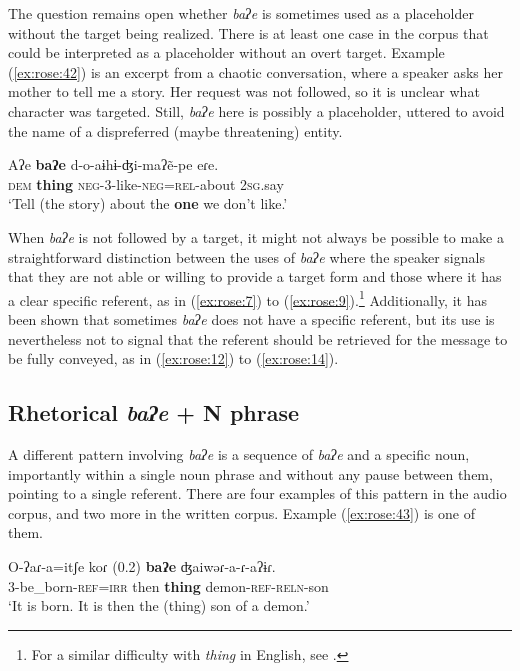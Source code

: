 \documentclass[output=paper]{langscibook}
\begin{document}
The question remains open whether \textit{baʔe} is sometimes used as a placeholder without the target being realized. There is at least one case in the corpus that could be interpreted as a placeholder without an overt target. Example (\ref{ex:rose:42}) is an excerpt from a chaotic conversation, where a speaker asks her mother to tell me a story. Her request was not followed, so it is unclear what character was targeted. Still, \textit{baʔe} here is possibly a placeholder, uttered to avoid the name of a dispreferred (maybe threatening) entity.


\ea \label{ex:rose:42}
\gll Aʔe  \textbf{baʔe}  d-o-aɨhɨ-ʤi-maʔẽ-pe      eɾe.\\
\textsc{dem}  \textbf{thing}  \textsc{neg}{}-3-like-\textsc{neg=rel}{}-about  2\textsc{sg}.say\\
\glt ‘Tell (the story) about the \textbf{one} we don’t like.’ 
\z 

When \textit{baʔe} is not followed by a target, it might not always be possible to make a straightforward distinction between the uses of \textit{baʔe} where the speaker signals that they are not able or willing to provide a target form and those where it has a clear specific referent, as in (\ref{ex:rose:7}) to (\ref{ex:rose:9}).\footnote{For a similar difficulty with \textit{thing} in English, see \citet{Pertejo2015}.} Additionally, it has been shown that sometimes \textit{baʔe} does not have a specific referent, but its use is nevertheless not to signal that the referent should be retrieved for the message to be fully conveyed, as in (\ref{ex:rose:12}) to (\ref{ex:rose:14}). 

\subsection{Rhetorical \textit{baʔe} + N phrase}
\label{sec:rose:4.3}
A different pattern involving \textit{baʔe} is a sequence of \textit{baʔe} and a specific noun, importantly within a single noun phrase and without any pause between them, pointing to a single referent. There are four examples of this pattern in the audio corpus, and two more in the written corpus. Example (\ref{ex:rose:43}) is one of them.


\ea \label{ex:rose:43}
\gll O-ʔaɾ-a=itʃe koɾ (0.2) \textbf{baʔe}   ʤaiwəɾ-a-ɾ-aʔɨɾ.\\
3-be\_born-\textsc{ref}=\textsc{irr}  then {} \textbf{thing} demon-\textsc{ref}-\textsc{reln}-son\\
\glt ‘It is born. It is then the (thing) son of a demon.’ 
\z 
\end{document}

